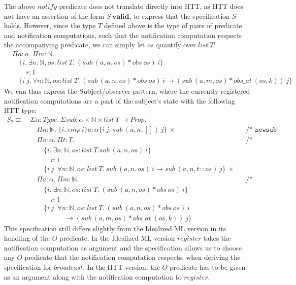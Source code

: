 \documentclass[a4paper,english]{article}
\newcommand{\N}[0]{\mathbb{N}}
\newcommand{\HPROP}[0]{Prop}
\newcommand{\TYPE}[0]{Type}
\newcommand{\LIST}[0]{list}
\newcommand{\VALID}[0]{\mathbf{valid}}
\newcommand{\pname}[1]{\texttt{/* #1 */}}
\begin{document}
The above $notify$ predicate does not translate directly into HTT, as HTT does
not have an assertion of the form $S\ \VALID$, to express that the
specification $S$ holds. However, since the type $T$ defined above is the type
of pairs of predicate and notification computations, such that the notification
computation respects the accompanying predicate, we can simply let $os$
quantify over $list\ T$:
\begin{align*}
&\Pi a : \alpha.\ \Pi m : \N.\\
&\quad\{ i.\ \exists n : \N, os : list\ T.\ (sub\ (a, n, os) * obs\ os)\ i \}\\
&\quad\quad r : 1\\
&\quad \{ i\ j.\ \forall n : \N, os : list\ T.\ (sub\ (a, n, os) * obs\ os)\ i \rightarrow (sub\ (a, m, os) * obs\_at\ (os, k))\ j \} 
\end{align*}
We can thus express the Subject/observer pattern, where the currently
registered notification computations are a part of the subject's state with the
following HTT type:
\begin{align*}
S_2 \equiv\ &\Sigma \alpha : \TYPE.\ \Sigma sub : \alpha \times \N \times \LIST\ T
\rightarrow \HPROP.\\
&\quad \Pi n : \N.\ \{ i.\ emp\ i \} a : \alpha \{ i\ j.\ sub\ (a, n, [])\ j \}\ \times && \pname{newsub}\\
&\quad \Pi a : \alpha.\ \Pi t : T. && \pname{register}\\
&\quad\quad\{ i.\ \exists n : \N, os : list\ T. sub\ (a, n, os)\ i \}\\
&\quad\quad\quad r : 1\\
&\quad\quad \{ i\ j.\ \forall n : \N, os : list\ T.\ sub\ (a, n, os)\ i \rightarrow sub\ (a, n, t::os)\ j
\}\ \times\\
&\quad \Pi a : \alpha.\ \Pi m : \N. && \pname{broadcast}\\
&\quad\quad\{ i.\ \exists n : \N, os : list\ T.\ (sub\ (a, n, os) * obs\ os)\ i \}\\
&\quad\quad\quad r : 1\\
&\quad\quad \{ i\ j.\ \forall n : \N, os : list\ T.\ (sub\ (a, n, os) * obs\ os)\ i\\
&\quad\quad\quad\quad\quad \rightarrow (sub\ (a, m, os) * obs\_at\ (os, k))\ j \}
\end{align*}
This specification still differs slightly from the Idealized ML version in its
handling of the $O$ predicate. In the Idealized ML version $register$ takes the
notification computation as argument and the specification allows us to choose
any $O$ predicate that the notification computation respects, when deriving the
specification for $broadcast$. In the HTT version, the $O$ predicate has to be
given as an argument along with the notification computation to $register$. 
\end{document}
